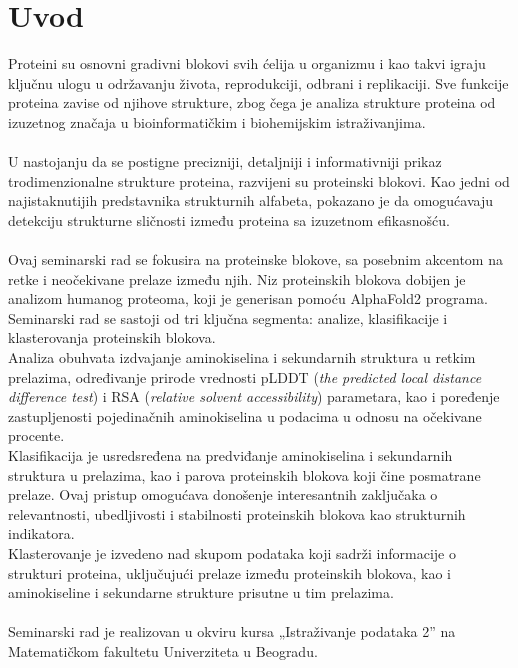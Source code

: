 \documentclass[a4paper,12pt]{article}
\begin{document}
\section{Uvod}
Proteini su osnovni gradivni blokovi svih ćelija u organizmu i kao takvi igraju ključnu ulogu u održavanju života, reprodukciji, odbrani i replikaciji. Sve funkcije proteina zavise od njihove strukture, zbog čega je analiza strukture proteina od izuzetnog značaja u bioinformatičkim i biohemijskim istraživanjima.\\
\\
U nastojanju da se postigne precizniji, detaljniji i informativniji prikaz trodimenzionalne strukture proteina, razvijeni su proteinski blokovi. Kao jedni od najistaknutijih predstavnika strukturnih alfabeta, pokazano je da omogućavaju detekciju strukturne sličnosti između proteina sa izuzetnom efikasnošću.\\
\\
Ovaj seminarski rad se fokusira na proteinske blokove, sa posebnim akcentom na retke i neočekivane prelaze između njih. Niz proteinskih blokova dobijen je analizom humanog proteoma, koji je generisan pomoću AlphaFold2 programa. Seminarski rad se sastoji od tri ključna segmenta: analize, klasifikacije i klasterovanja proteinskih blokova.\\
Analiza obuhvata izdvajanje aminokiselina i sekundarnih struktura u retkim prelazima, određivanje prirode vrednosti pLDDT (\textit{the predicted local distance difference test}) i RSA (\textit{relative solvent accessibility}) parametara, kao i poređenje zastupljenosti pojedinačnih aminokiselina u podacima u odnosu na očekivane procente. \\
Klasifikacija je usredsređena na predviđanje aminokiselina i sekundarnih struktura u prelazima, kao i parova proteinskih blokova koji čine posmatrane prelaze. Ovaj pristup omogućava donošenje interesantnih zaključaka o relevantnosti, ubedljivosti i stabilnosti proteinskih blokova kao strukturnih indikatora. \\
Klasterovanje je izvedeno nad skupom podataka koji sadrži informacije o strukturi proteina, uključujući prelaze između proteinskih blokova, kao i aminokiseline i sekundarne strukture prisutne u tim prelazima. \\
\\
Seminarski rad je realizovan u okviru kursa „Istraživanje podataka 2” na Matematičkom fakultetu Univerziteta u Beogradu.
\newpage
\end{document}
